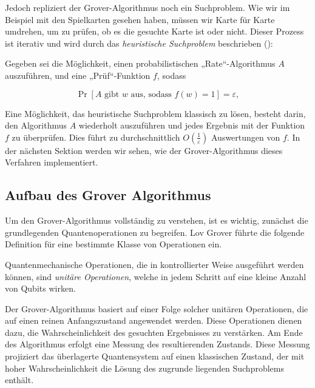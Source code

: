 Jedoch repliziert der Grover-Algorithmus noch ein Suchproblem. Wie wir im Beispiel mit den Spielkarten gesehen haben, müssen wir Karte für Karte umdrehen, um zu prüfen, ob es die gesuchte Karte ist oder nicht. Dieser Prozess ist iterativ und wird durch das \textit{heuristische Suchproblem} beschrieben (\cite{montanaro_quantum_2016}):

\begin{definition}
Gegeben sei die Möglichkeit, einen probabilistischen „Rate“-Algorithmus \( A \) auszuführen, und eine „Prüf“-Funktion \( f \), sodass

\[
\Pr\left[ A \text{ gibt } w \text{ aus, sodass } f(w) = 1 \right] = \varepsilon,
\]
\end{definition}

Eine Möglichkeit, das heuristische Suchproblem klassisch zu lösen, besteht darin, den Algorithmus \( A \) wiederholt auszuführen und jedes Ergebnis mit der Funktion \( f \) zu überprüfen. Dies führt zu durchschnittlich \( O\left(\frac{1}{\varepsilon}\right) \) Auswertungen von \( f \). In der nächsten Sektion werden wir sehen, wie der Grover-Algorithmus dieses Verfahren implementiert.

\subsection{Aufbau des Grover Algorithmus}

Um den Grover-Algorithmus vollständig zu verstehen, ist es wichtig, zunächst die grundlegenden Quantenoperationen zu begreifen. Lov Grover führte die folgende Definition für eine bestimmte Klasse von Operationen ein.\cite[1-2]{zotero-1211}

\begin{definition}
Quantenmechanische Operationen, die in kontrollierter Weise ausgeführt werden können, sind \emph{unitäre Operationen}, welche in jedem Schritt auf eine kleine Anzahl von Qubits wirken.
\end{definition}

Der Grover-Algorithmus basiert auf einer Folge solcher unitären Operationen, die auf einen reinen Anfangszustand angewendet werden. Diese Operationen dienen dazu, die Wahrscheinlichkeit des gesuchten Ergebnisses zu verstärken. Am Ende des Algorithmus erfolgt eine Messung des resultierenden Zustands. Diese Messung projiziert das überlagerte Quantensystem auf einen klassischen Zustand, der mit hoher Wahrscheinlichkeit die Lösung des zugrunde liegenden Suchproblems enthält.\\

